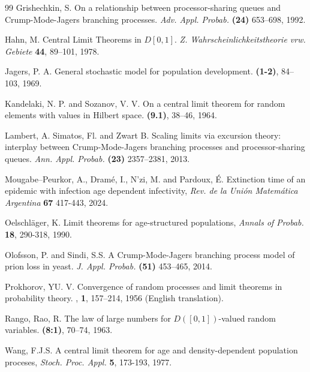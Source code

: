 \documentclass[11pt]{article}
\begin{document}
\begin{thebibliography}{99}
Grishechkin, S.  On a relationship between processor-sharing queues and Crump-Mode-Jagers branching processes. {\it Adv. Appl.
Probab.} {\bf(24)} 653--698, 1992.

Hahn, M. Central Limit Theorems in $D[0,1]$. {\it Z. Wahrscheinlichkeitstheorie vrw. Gebiete} {\bf44}, 89--101, 1978. 


  Jagers, P. A. General stochastic model for population development.   {\bf(1-2)}, 84--103, 1969.

  Kandelaki, N. P. and Sozanov, V. V.  On a central limit theorem for random elements with values in Hilbert space.   {\bf(9.1)}, 38--46, 1964.

 Lambert, A.  Simatos, Fl. and  Zwart B. Scaling limits via excursion theory: interplay between Crump-Mode-Jagers branching
processes and processor-sharing queues. {\it Ann. Appl. Probab.} {\bf(23)} 2357--2381, 2013.

 Mougabe--Peurkor, A., Dram\'e, I., N'zi, M. and Pardoux, \'E. Extinction time of an epidemic 
with infection age dependent infectivity, {\it Rev. de la Uni\'on Matem\'atica Argentina} {\bf67} 417-443, 2024.

 Oelschl\"ager, K. Limit theorems for age-structured populations, {\it Annals of Probab.} {\bf18}, 290-318, 1990.

Olofsson, P. and  Sindi, S.S. A Crump-Mode-Jagers branching process model of prion loss in yeast. {\it J. Appl. Probab.} {\bf(51)} 453--465, 2014.


Prokhorov, YU. V. Convergence of random processes and limit theorems in probability theory. , {\bf 1}, 157--214, 1956 (English translation).    

Rango, Rao, R. The law of large numbers for $D([0,1])$-valued random variables.   {\bf(8:1)}, 70--74, 1963.


 Wang, F.J.S. A central limit theorem for age and density-dependent population proceses, {\it Stoch. Proc. Appl.} {\bf5}, 173-193, 1977.

\end{thebibliography}
\end{document}
